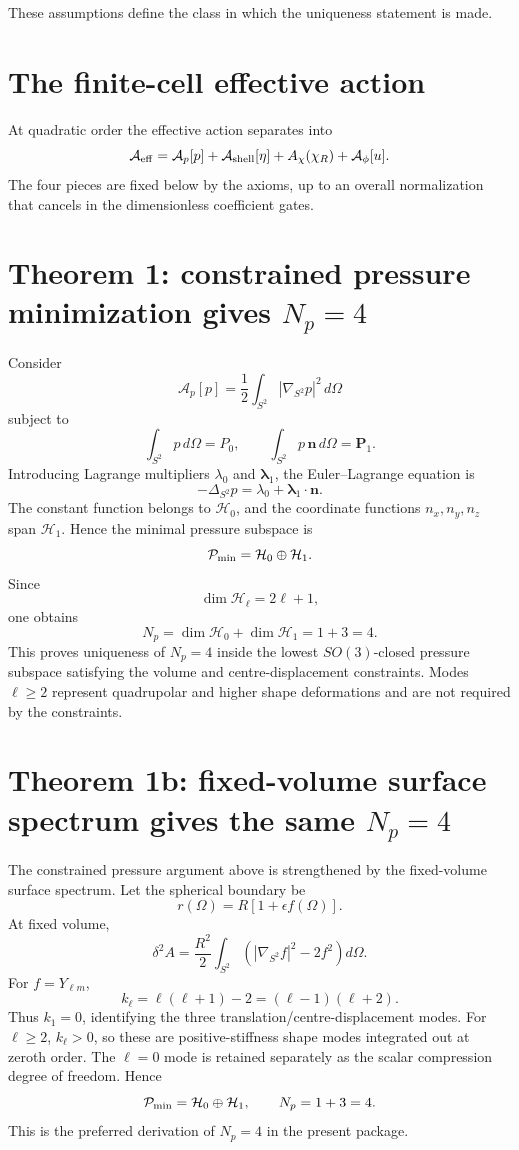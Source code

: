 \documentclass[11pt]{article}
\newcommand{\Harm}{\mathcal H}
\begin{document}
These assumptions define the class in which the uniqueness statement is made.

\section{The finite-cell effective action}

At quadratic order the effective action separates into
\[
  \mathcal A_{\rm eff}
  =
  \mathcal A_p[p]
  +
  \mathcal A_{\rm shell}[\eta]
  +
  A_\chi(\chi_R)
  +
  \mathcal A_\phi[u].
\]
The four pieces are fixed below by the axioms, up to an overall normalization
that cancels in the dimensionless coefficient gates.

\section{Theorem 1: constrained pressure minimization gives \(N_p=4\)}

Consider
\[
  \mathcal A_p[p]
  =
  \frac12
  \int_{S^2}
  |\nabla_{S^2}p|^2\,d\Omega
\]
subject to
\[
  \int_{S^2}p\,d\Omega=P_0,
  \qquad
  \int_{S^2}p\,\mathbf n\,d\Omega=\mathbf P_1.
\]
Introducing Lagrange multipliers \(\lambda_0\) and
\(\boldsymbol{\lambda}_1\), the Euler--Lagrange equation is
\[
  -\Delta_{S^2}p
  =
  \lambda_0+\boldsymbol{\lambda}_1\cdot\mathbf n.
\]
The constant function belongs to \(\Harm_0\), and the coordinate functions
\(n_x,n_y,n_z\) span \(\Harm_1\).  Hence the minimal pressure subspace is
\[
  \mathcal P_{\rm min}
  =
  \Harm_0\oplus\Harm_1.
\]
Since
\[
  \dim\Harm_\ell=2\ell+1,
\]
one obtains
\[
  N_p
  =
  \dim\Harm_0+\dim\Harm_1
  =
  1+3
  =
  4.
\]
This proves uniqueness of \(N_p=4\) inside the lowest \(SO(3)\)-closed pressure
subspace satisfying the volume and centre-displacement constraints.  Modes
\(\ell\ge2\) represent quadrupolar and higher shape deformations and are not
required by the constraints.


\section{Theorem 1b: fixed-volume surface spectrum gives the same \(N_p=4\)}

The constrained pressure argument above is strengthened by the fixed-volume
surface spectrum.  Let the spherical boundary be
\[
  r(\Omega)=R[1+\epsilon f(\Omega)].
\]
At fixed volume,
\[
  \delta^2 A
  =
  \frac{R^2}{2}
  \int_{S^2}
  \left(
  |\nabla_{S^2}f|^2-2f^2
  \right)d\Omega.
\]
For \(f=Y_{\ell m}\),
\[
  k_\ell
  =
  \ell(\ell+1)-2
  =
  (\ell-1)(\ell+2).
\]
Thus \(k_1=0\), identifying the three translation/centre-displacement modes.
For \(\ell\ge2\), \(k_\ell>0\), so these are positive-stiffness shape modes
integrated out at zeroth order.  The \(\ell=0\) mode is retained separately as
the scalar compression degree of freedom.  Hence
\[
  \mathcal P_{\rm min}
  =
  \mathcal H_0\oplus\mathcal H_1,
  \qquad
  N_p=1+3=4.
\]
This is the preferred derivation of \(N_p=4\) in the present package.
\end{document}
